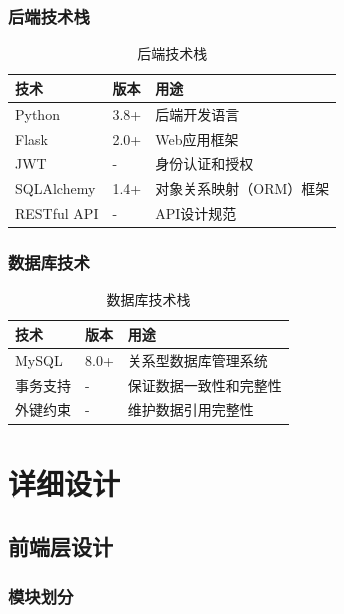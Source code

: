 \documentclass[a4paper]{article}
\begin{document}
\subsubsection{后端技术栈}

\begin{table}[H]
\centering
\begin{tabular}{|l|l|p{6cm}|}
\hline
\textbf{技术} & \textbf{版本} & \textbf{用途} \\
\hline
Python & 3.8+ & 后端开发语言 \\
\hline
Flask & 2.0+ & Web应用框架 \\
\hline
JWT & - & 身份认证和授权 \\
\hline
SQLAlchemy & 1.4+ & 对象关系映射（ORM）框架 \\
\hline
RESTful API & - & API设计规范 \\
\hline
\end{tabular}
\caption{后端技术栈}
\end{table}

\subsubsection{数据库技术}

\begin{table}[H]
\centering
\begin{tabular}{|l|l|p{6cm}|}
\hline
\textbf{技术} & \textbf{版本} & \textbf{用途} \\
\hline
MySQL & 8.0+ & 关系型数据库管理系统 \\
\hline
事务支持 & - & 保证数据一致性和完整性 \\
\hline
外键约束 & - & 维护数据引用完整性 \\
\hline
\end{tabular}
\caption{数据库技术栈}
\end{table}

\section{详细设计}

\subsection{前端层设计}

\subsubsection{模块划分}
\end{document}
